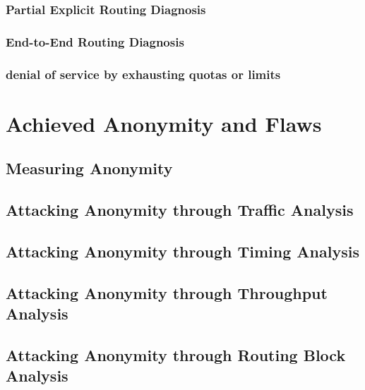 \subsubsection{Partial Explicit Routing Diagnosis}
\subsubsection{End-to-End Routing Diagnosis}
\subsubsection{denial of service by exhausting quotas or limits}

\section{Achieved Anonymity and Flaws}

\subsection{Measuring Anonymity}

\subsection{Attacking Anonymity through Traffic Analysis}

\subsection{Attacking Anonymity through Timing Analysis}

\subsection{Attacking Anonymity through Throughput Analysis}

\subsection{Attacking Anonymity through Routing Block Analysis}


